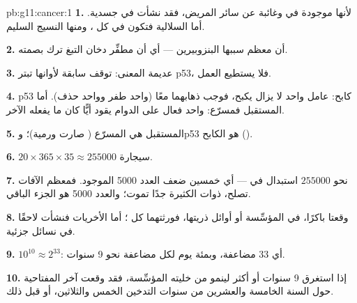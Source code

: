 \begin{solution}{pb:g11:cancer:1}
\textbf{1.} لأنها موجودة في  وغائبة عن سائر  المريض، فقد
نشأت في  جسدية. أما  السلالية فتكون في كل ، ومنها
النسيج السليم.

\textbf{2.} أن معظم   سببها البنزوبيرين --- أي أن مطفِّر دخان
التبغ ترك بصمته.

\textbf{3.}  عديمة المعنى:  توقف سابقة لأوانها تبتر p53،
فلا يستطيع العمل.

\textbf{4.} p53 كابح:  عامل واحد لا يزال يكبح، فوجب ذهابهما معًا
(واحد طفر وواحد حذف). أما المستقبل فمسرّع:  واحد فعال على
الدوام يقود  أيًّا كان ما يفعله  الآخر.

\textbf{5.}  المستقبل هي المسرّع ( صارت 
ورمية)؛ وp53 هو الكابح ().

\textbf{6.} $20 \times 365 \times 35 \approx \num{255000}$ سيجارة.

\textbf{7.} نحو $\num{255000}$ استبدال في  --- أي خمسين ضعف
العدد 5000 الموجود. فمعظم الآفات تصلح،  ذوات  الكثيرة
جدًا تموت؛ والعدد 5000 هو الجزء الباقي.

\textbf{8.} وقعتا باكرًا، في  المؤسِّسة أو أوائل ذريتها، فورثتهما
كل  ؛ أما الأخريات فنشأت لاحقًا في نسائل جزئية.

\textbf{9.} $10^{10} \approx 2^{33}$: أي 33 مضاعفة، وبمئة يوم لكل
مضاعفة نحو 9 سنوات.

\textbf{10.} إذا استغرق  9 سنوات أو أكثر لينمو من خليته
المؤسِّسة، فقد وقعت آخر  المفتاحية حول السنة الخامسة والعشرين
من سنوات التدخين الخمس والثلاثين، أو قبل ذلك.


\end{solution}
